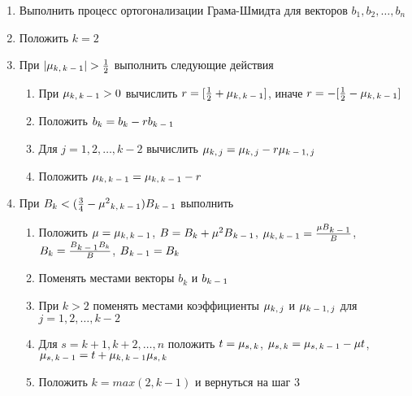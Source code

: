     \begin{enumerate}
     \item Выполнить процесс ортогонализации Грама-Шмидта для векторов {$b_1, b_2, \dots, b_n$} 
     \item Положить {$k=2$}
     \item При {$ |\mu\textsubscript{{$k,k-1$}}| > \frac{1}{2}$} выполнить следующие действия
     
      \begin{enumerate}
       \item При {$ \mu\textsubscript{{$k,k-1$}} > 0 $} вычислить {$r=[\frac{1}{2} + \mu\textsubscript{{$k,k-1$}}]$}, иначе {$r=-[\frac{1}{2} - \mu\textsubscript{{$k,k-1$}}]$}
       \item Положить {$b_k = b_k - r b\textsubscript{{$k-1$}}$}
       \item Для {$j=1,2,\dots,k-2$} вычислить {$ \mu\textsubscript{{$k,j$}}=\mu\textsubscript{{$k,j$}} - r \mu\textsubscript{{$k-1,j$}} $}
       \item Положить {$ \mu\textsubscript{{$k,k-1$}}=\mu\textsubscript{{$k,k-1$}} - r $}
      \end{enumerate}
     
     \item При {$ B_k < (\frac{3}{4} - \mu^2\textsubscript{{$k,k-1$}})B\textsubscript{{$k-1$}} $} выполнить
     
      \begin{enumerate}
       \item Положить {$\mu = \mu\textsubscript{{$k,k-1$}}$}, {$B=B_k + \mu^2 B\textsubscript{{$k-1$}}$}, {$\mu\textsubscript{{$k,k-1$}}=\frac{\mu B\textsubscript{{$k-1$}}}{B}$},
	{$B_k = \frac{B\textsubscript{{$k-1$}} B_k}{B}$}, {$B\textsubscript{{$k-1$}} = B_k$}
       \item Поменять местами векторы {$b_k$} и {$b\textsubscript{{$k-1$}}$}
       \item При {$k > 2$} поменять местами коэффициенты {$\mu\textsubscript{{$k,j$}}$} и {$\mu\textsubscript{{$k-1,j$}}$} для {$j=1,2,\dots,k-2$}
       \item Для {$s=k+1,k+2,\dots,n$} положить {$t=\mu\textsubscript{{$s,k$}}$}, {$\mu\textsubscript{{$s,k$}}=\mu\textsubscript{{$s,k-1$}}-\mu t$},
	{$\mu\textsubscript{{$s,k-1$}}=t + \mu\textsubscript{{$k,k-1$}} \mu\textsubscript{{$s,k$}}$}
       \item Положить {$k = max(2,k-1)$} и вернуться на шаг 3
      \end{enumerate}
     

\end{enumerate}
